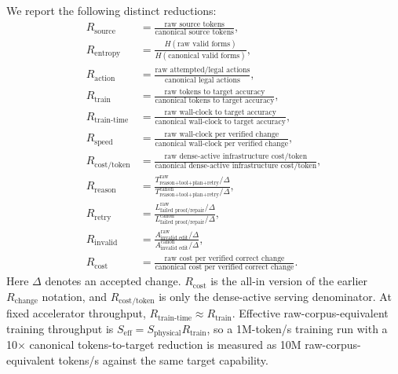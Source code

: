 We report the following distinct reductions:
\begin{align}
R_{\text{source}} &= \frac{\text{raw source tokens}}{\text{canonical source tokens}}, \\
R_{\text{entropy}} &= \frac{H(\text{raw valid forms})}{H(\text{canonical valid forms})}, \\
R_{\text{action}} &= \frac{\text{raw attempted/legal actions}}{\text{canonical legal actions}}, \\
R_{\text{train}} &= \frac{\text{raw tokens to target accuracy}}{\text{canonical tokens to target accuracy}}, \\
R_{\text{train-time}} &= \frac{\text{raw wall-clock to target accuracy}}{\text{canonical wall-clock to target accuracy}}, \\
R_{\text{speed}} &= \frac{\text{raw wall-clock per verified change}}{\text{canonical wall-clock per verified change}}, \\
R_{\text{cost/token}} &= \frac{\text{raw dense-active infrastructure cost/token}}{\text{canonical dense-active infrastructure cost/token}}, \\
R_{\text{reason}} &= \frac{T^{\text{raw}}_{\text{reason+tool+plan+retry}}/\Delta}{T^{\text{canon}}_{\text{reason+tool+plan+retry}}/\Delta}, \\
R_{\text{retry}} &= \frac{L^{\text{raw}}_{\text{failed proof/repair}}/\Delta}{L^{\text{canon}}_{\text{failed proof/repair}}/\Delta}, \\
R_{\text{invalid}} &= \frac{A^{\text{raw}}_{\text{invalid edit}}/\Delta}{A^{\text{canon}}_{\text{invalid edit}}/\Delta}, \\
R_{\text{cost}} &= \frac{\text{raw cost per verified correct change}}{\text{canonical cost per verified correct change}}.
\end{align}
Here $\Delta$ denotes an accepted change. $R_{\text{cost}}$ is the all-in version of the earlier $R_{\text{change}}$ notation, and $R_{\text{cost/token}}$ is only the dense-active serving denominator. At fixed accelerator throughput, $R_{\text{train-time}} \approx R_{\text{train}}$. Effective raw-corpus-equivalent training throughput is $S_{\text{eff}} = S_{\text{physical}}R_{\text{train}}$, so a 1M-token/s training run with a 10$\times$ canonical tokens-to-target reduction is measured as 10M raw-corpus-equivalent tokens/s against the same target capability.

